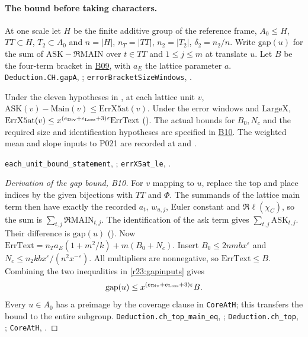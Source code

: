 \paragraph{The bound before taking characters.}
At one scale let $H$ be the finite additive group of the reference frame,
$A_0\le H$, $TT\subset H$, $T_2\subset A_0$ and
$n=|H|$, $n_T=|TT|$, $n_2=|T_2|$, $\delta_2=n_2/n$.
Write $\mathrm{gap}(u)$ for the sum of
$\mathrm{ASK}-\Re\mathrm{MAIN}$ over $t\in TT$ and $1\le j\le m$
at translate $u$. Let $B$ be the four-term bracket in
\hyperref[sub:B09]{B09}, with $a_E$ the lattice parameter $a$.
\nolinkurl{Deduction.CH.gapA}, ;
\nolinkurl{errorBracketSizeWindows}, .

\begin{formalstatement}\label{r23:gapinputs}
Under the eleven hypotheses in , at each lattice unit $v$,
$\mathrm{ASK}(v)-\mathrm{Main}(v)\le\mathrm{ErrX5at}(v)$.
Under the error windows and $\mathrm{LargeX}$,
$\mathrm{ErrX5at}(v)\le x^{(e_{\rm Div}+e_{\rm Loss}+3)\varepsilon}
\mathrm{ErrText}$ (). The actual bounds for $B_0,N_c$
and the required size and identification hypotheses are specified in
\hyperref[sub:B10]{B10}. The weighted mean and slope inputs to P021
are recorded at  and .
\end{formalstatement}
\noindent\nolinkurl{each_unit_bound_statement}, ;
\nolinkurl{errX5at_le}, .

\begin{proof}[Derivation of the gap bound, B10]
For $v$ mapping to $u$, replace the top and place indices by the given
bijections with $TT$ and $\Phi$. The summands of the lattice main term
then have exactly the recorded $a_t$, $w_{u,j}$, Euler constant and
$\Re\ell(\chi_C)$, so the sum is $\sum_{t,j}\Re\mathrm{MAIN}_{t,j}$.
The identification of the ask term gives $\sum_{t,j}\mathrm{ASK}_{t,j}$.
Their difference is $\mathrm{gap}(u)$ ().
Now $\mathrm{ErrText}=n_Ta_E(1+m^2/k)+m(B_0+N_c)$.
Insert $B_0\le2nmbx^\varepsilon$ and
$N_c\le n_2 k b x^\varepsilon/(n^2x^{-\varepsilon})$.
All multipliers are nonnegative, so $\mathrm{ErrText}\le B$.
Combining the two inequalities in \ref{r23:gapinputs} gives
\[
    \mathrm{gap}(u)\le x^{(e_{\rm Div}+e_{\rm Loss}+3)\varepsilon}B.
\]
Every $u\in A_0$ has a preimage by the coverage clause in
\nolinkurl{CoreAtH}; this transfers the bound to the entire subgroup.
\nolinkurl{Deduction.ch_top_main_eq}, ;
\nolinkurl{Deduction.ch_top}, ;
\nolinkurl{CoreAtH}, .
\end{proof}

